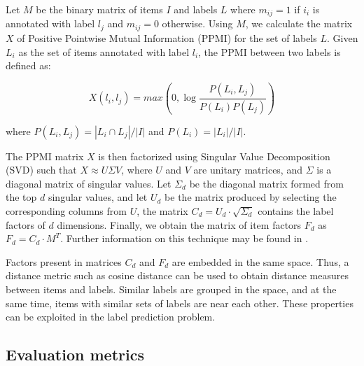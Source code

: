 Let $M$ be the binary matrix of items $I$ and labels $L$ where $m_{ij} = 1$ if $i_i$ is annotated with label $l_j$ and $m_{ij} = 0$ otherwise. Using $M$, we calculate the matrix $X$ of Positive Pointwise Mutual Information (PPMI) for the set of labels $L$. Given $L_i$ as the set of items annotated with label $l_i$, the PPMI between two labels is defined as:

\begin{equation}
X(l_i,l_j) =
max\left(0,\log{\frac{P(L_i,L_j)
  }{
    P(L_i)P(L_j)
  }}\right)
\end{equation}

where $P(L_i,L_j) = |L_i \cap L_j| / |I|$ and $P(L_i) = |L_i| / |I|$.

The PPMI matrix $X$ is then factorized using Singular Value Decomposition (SVD) such that $X \approx U \Sigma V$, where $U$ and $V$ are unitary matrices, and $\Sigma$ is a diagonal matrix of singular values. Let $\Sigma_d$ be the diagonal matrix formed from the top $d$ singular values, and let $U_d$ be the matrix produced by selecting the corresponding columns from $U$, the matrix $C_d = U_d \cdot \sqrt{\Sigma_d}$ contains the label factors of $d$ dimensions. Finally, we obtain the matrix of item factors $F_d$ as $F_d = C_d \cdot M^T$. Further information on this technique may be found in \cite{levy2014neural}.

Factors present in matrices $C_d$ and $F_d$ are embedded in the same space. Thus, a distance metric such as cosine distance can be used to obtain distance measures between items and labels. Similar labels are grouped in the space, and at the same time, items with similar sets of labels are near each other. These properties can be exploited in the label prediction problem.


\subsection{Evaluation metrics}\label{sec:multi-class:metrics}

